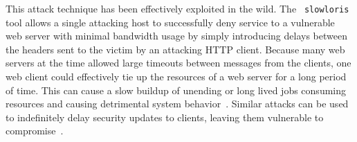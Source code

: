 This attack technique has been effectively exploited in the wild.  The {\tt 
slowloris} tool
allows a single attacking host to successfully deny service to a vulnerable
web server with minimal bandwidth usage by simply introducing
delays between the headers sent to the victim by an attacking HTTP
client.  Because many web servers at the time allowed large timeouts between
messages from the clients, one web client could
effectively tie up the resources of a web server for a long period of
time.
This can cause a slow buildup of unending or long
lived jobs consuming resources and causing detrimental system 
behavior~\cite{Slowloris}.  Similar attacks can be used to indefinitely 
delay security updates to clients, leaving them vulnerable to 
compromise~\cite{Cappos_TR_08}.



